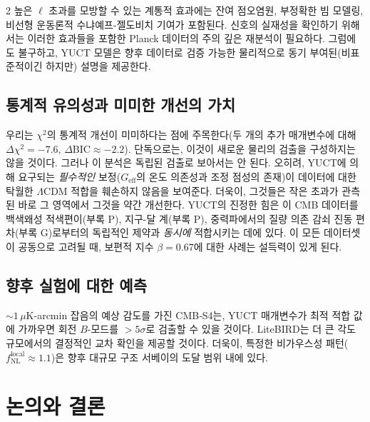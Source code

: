 \documentclass[11pt,a4paper]{article}
\begin{document}
\begin{multicols}{2}
		높은 $\ell$ 초과를 모방할 수 있는 계통적 효과에는 잔여 점오염원, 부정확한 빔 모델링, 비선형 운동론적 수냐예프-젤도비치 기여가 포함된다. 신호의 실재성을 확인하기 위해서는 이러한 효과들을 포함한 Planck 데이터의 주의 깊은 재분석이 필요하다. 그럼에도 불구하고, YUCT 모델은 향후 데이터로 검증 가능한 물리적으로 동기 부여된(비표준적이긴 하지만) 설명을 제공한다.
		
		\subsection{통계적 유의성과 미미한 개선의 가치}
		
		우리는 $\chi^2$의 통계적 개선이 미미하다는 점에 주목한다(두 개의 추가 매개변수에 대해 $\Delta\chi^2 = -7.6$, $\Delta\mathrm{BIC} \approx -2.2$). 단독으로는, 이것이 새로운 물리의 검출을 구성하지는 않을 것이다. 그러나 이 분석은 독립된 검출로 보아서는 안 된다. 오히려, YUCT에 의해 요구되는 \textit{필수적인} 보정($G_{\mathrm{eff}}$의 온도 의존성과 조정 점성의 존재)이 데이터에 대한 탁월한 $\Lambda$CDM 적합을 훼손하지 않음을 보여준다. 더욱이, 그것들은 작은 초과가 관측된 바로 그 영역에서 그것을 약간 개선한다. YUCT의 진정한 힘은 이 CMB 데이터를 백색왜성 적색편이(부록 P), 지구-달 계(부록 P), 중력파에서의 질량 의존 감쇠 진동 편차(부록 G)로부터의 독립적인 제약과 \textit{동시에} 적합시키는 데에 있다. 이 모든 데이터셋이 공동으로 고려될 때, 보편적 지수 $\beta=0.67$에 대한 사례는 설득력이 있게 된다.
		
		\subsection{향후 실험에 대한 예측}
		
		$\sim 1\,\mu$K-arcmin 잡음의 예상 감도를 가진 CMB‑S4는, YUCT 매개변수가 최적 적합 값에 가까우면 회전 $B$-모드를 $>5\sigma$로 검출할 수 있을 것이다. LiteBIRD는 더 큰 각도 규모에서의 결정적인 교차 확인을 제공할 것이다. 더욱이, 특정한 비가우스성 패턴($f_{\mathrm{NL}}^{\mathrm{local}} \approx 1.1$)은 향후 대규모 구조 서베이의 도달 범위 내에 있다.
		
		\section{논의와 결론}
		

\end{multicols}
\end{document}
